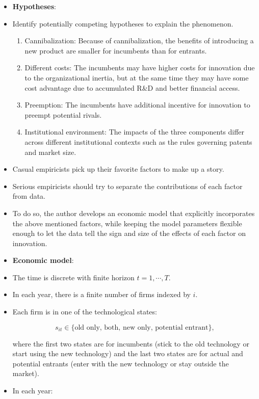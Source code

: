 \documentclass[]{book}
\providecommand{\tightlist}{%
  \setlength{\itemsep}{0pt}\setlength{\parskip}{0pt}}
\begin{document}
\begin{itemize}
\item
  \textbf{Hypotheses}:
\item
  Identify potentially competing hypotheses to explain the phenomenon.

  \begin{enumerate}
  \def\labelenumi{\arabic{enumi}.}
  \tightlist
  \item
    Cannibalization: Because of cannibalization, the benefits of
    introducing a new product are smaller for incumbents than for
    entrants.
  \item
    Different costs: The incumbents may have higher costs for innovation
    due to the organizational inertia, but at the same time they may
    have some cost advantage due to accumulated R\&D and better
    financial access.
  \item
    Preemption: The incumbents have additional incentive for innovation
    to preempt potential rivals.
  \item
    Institutional environment: The impacts of the three components
    differ across different institutional contexts such as the rules
    governing patents and market size.
  \end{enumerate}
\item
  Casual empiricists pick up their favorite factors to make up a story.
\item
  Serious empiricists should try to separate the contributions of each
  factor from data.
\item
  To do so, the author develops an economic model that explicitly
  incorporates the above mentioned factors, while keeping the model
  parameters flexible enough to let the data tell the sign and size of
  the effects of each factor on innovation.
\item
  \textbf{Economic model}:
\item
  The time is discrete with finite horizon \(t = 1, \cdots, T\).
\item
  In each year, there is a finite number of firms indexed by \(i\).
\item
  Each firm is in one of the technological states:

  \begin{equation}
  s_{it} \in \{\text{old only, both, new only, potential entrant}\},
  \end{equation}

  where the first two states are for incumbents (stick to the old
  technology or start using the new technology) and the last two states
  are for actual and potential entrants (enter with the new technology
  or stay outside the market).
\item
  In each year:


\end{itemize}
\end{document}
